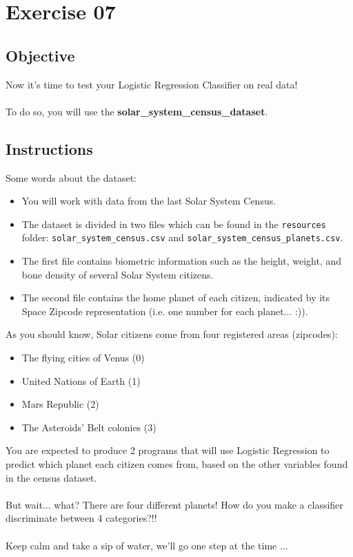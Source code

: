 \chapter{Exercise 07}
%
{}
\makeheaderfilesforbidden


\section*{Objective}
Now it's time to test your Logistic Regression Classifier on real data!\\
\\ 
To do so, you will use the \textbf{solar\_system\_census\_dataset}.

\section*{Instructions}
Some words about the dataset:
\begin{itemize}
  \item You will work with data from the last Solar System Census.
  \item The dataset is divided in two files which can be found in the \texttt{resources} folder: \texttt{solar\_system\_census.csv} and \texttt{solar\_system\_census\_planets.csv}.
  \item The first file contains biometric information such as the height, weight, and bone density of several Solar System citizens.
  \item The second file contains the home planet of each citizen, indicated by its Space Zipcode representation (i.e. one number for each planet... :)).
\end{itemize}

\newpage
As you should know, Solar citizens come from four registered areas (zipcodes): 
\begin{itemize}
  \item The flying cities of Venus (0)
  \item United Nations of Earth (1)
  \item Mars Republic (2)
  \item The Asteroids' Belt colonies (3)
\end{itemize}
\bigskip
You are expected to produce 2 programs that will use Logistic Regression to predict which planet 
each citizen comes from, based on the other variables found in the census dataset.\\
\\
But wait... what? There are four different planets! How do you make a classifier 
discriminate between 4 categories?!!\\
\\
Keep calm and take a sip of water, we'll go one step at the time ...\\

